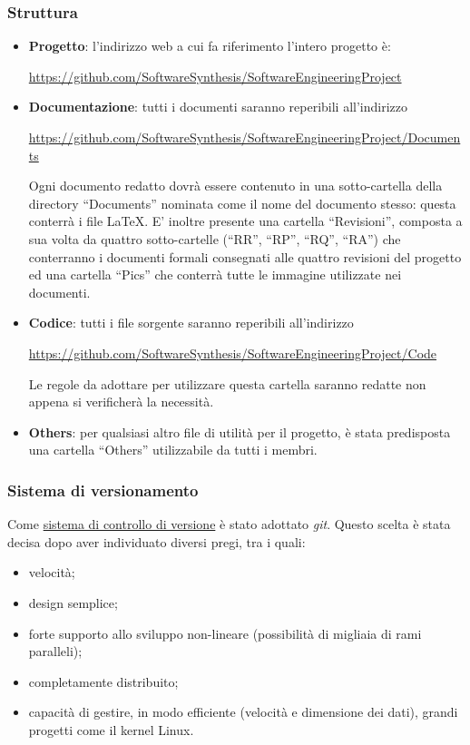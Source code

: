 \subsubsection{Struttura}
\label{sec:struttura}
\begin{itemize}
\item \textbf{Progetto}: l'indirizzo web a cui fa riferimento l'intero progetto è: 
\begin{center}
\url{https://github.com/SoftwareSynthesis/SoftwareEngineeringProject}
\end{center} 
\item \textbf{Documentazione}: tutti i documenti saranno reperibili all'indirizzo
\begin{center}
\url{https://github.com/SoftwareSynthesis/SoftwareEngineeringProject/Documents}
\end{center}
Ogni documento redatto dovrà essere contenuto in una sotto-cartella della directory ``Documents'' nominata come il nome del documento stesso: questa conterrà i file \LaTeX. E' inoltre presente una cartella ``Revisioni'', composta a sua volta da quattro sotto-cartelle (``RR'', ``RP'', ``RQ'', ``RA'') che conterranno i documenti formali consegnati alle quattro revisioni del progetto ed una cartella ``Pics'' che conterrà tutte le immagine utilizzate nei documenti.
\item \textbf{Codice}: tutti i file sorgente saranno reperibili all'indirizzo
\begin{center}
\url{https://github.com/SoftwareSynthesis/SoftwareEngineeringProject/Code}
\end{center}
Le regole da adottare per utilizzare questa cartella saranno redatte non appena si verificherà la necessità.
\item \textbf{Others}: per qualsiasi altro file di utilità per il progetto, è stata predisposta una cartella ``Others'' utilizzabile da tutti i membri.
\end{itemize}

\subsubsection{Sistema di versionamento}
Come \underline{sistema di controllo di versione}  è stato adottato \textit{git}. Questo scelta è stata decisa dopo aver individuato diversi pregi, tra i quali:
\begin{itemize}
\item velocità;
\item design semplice;
\item forte supporto allo sviluppo non-lineare (possibilità di migliaia di rami paralleli);
\item completamente distribuito;
\item capacità di gestire, in modo efficiente (velocità e dimensione dei dati), grandi progetti come il kernel Linux.
\end{itemize}

